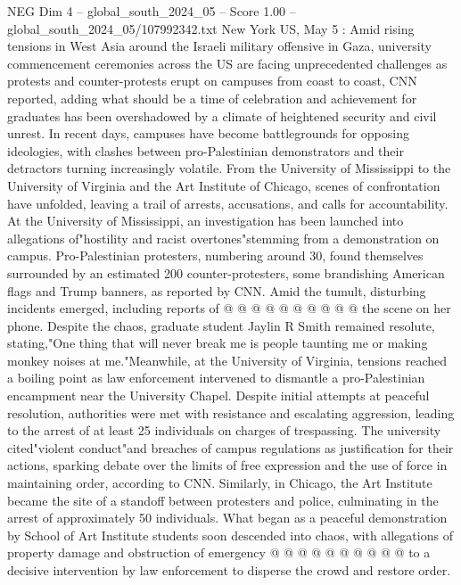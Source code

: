 \begin{textsample}{NEG Dim 4 – global\_south\_2024\_05 – Score 1.00 – global\_south\_2024\_05/107992342.txt}  \label{ex:f4_neg_279}
New York US, May 5 : Amid rising tensions in West Asia around the Israeli military offensive in Gaza, university commencement ceremonies across the US are facing unprecedented challenges as protests and counter-protests erupt on campuses from coast to coast, CNN reported, adding what should be a time of celebration and achievement for graduates has been overshadowed by a climate of heightened security and civil unrest.
In recent days, campuses have become battlegrounds for opposing ideologies, with clashes between pro-Palestinian demonstrators and their detractors turning increasingly volatile.
From the University of Mississippi to the University of Virginia and the Art Institute of Chicago, scenes of confrontation have unfolded, leaving a trail of arrests, accusations, and calls for accountability.
At the University of Mississippi, an investigation has been launched into allegations of"hostility and racist overtones"stemming from a demonstration on campus.
Pro-Palestinian protesters, numbering around 30, found themselves surrounded by an estimated 200 counter-protesters, some brandishing American flags and Trump banners, as reported by CNN.
Amid the tumult, disturbing incidents emerged, including reports of @ @ @ @ @ @ @ @ @ @ the scene on her phone.
Despite the chaos, graduate student Jaylin R Smith remained resolute, stating,"One thing that will never break me is people taunting me or making monkey noises at me."Meanwhile, at the University of Virginia, tensions reached a boiling point as law enforcement intervened to dismantle a pro-Palestinian encampment near the University Chapel.
Despite initial attempts at peaceful resolution, authorities were met with resistance and escalating aggression, leading to the arrest of at least 25 individuals on charges of trespassing.
The university cited"violent conduct"and breaches of campus regulations as justification for their actions, sparking debate over the limits of free expression and the use of force in maintaining order, according to CNN.
Similarly, in Chicago, the Art Institute became the site of a standoff between protesters and police, culminating in the arrest of approximately 50 individuals.
What began as a peaceful demonstration by School of Art Institute students soon descended into chaos, with allegations of property damage and obstruction of emergency @ @ @ @ @ @ @ @ @ @ to a decisive intervention by law enforcement to disperse the crowd and restore order.

\end{textsample}
